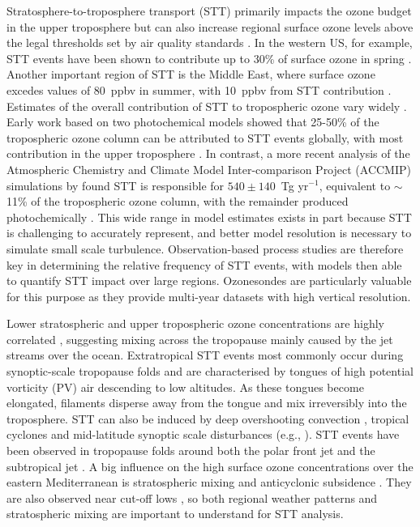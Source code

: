 Stratosphere-to-troposphere transport (STT) primarily impacts the ozone budget in the upper troposphere but can also increase regional surface ozone levels above the legal thresholds set by air quality standards \citep{Danielson1968, Lelieveld2009, Lefohn2011, Langford2012, Zhang2014}.
In the western US, for example, STT events have been shown to contribute up to 30\% of surface ozone in spring \citep{Lin2012}.
Another important region of STT is the Middle East, where surface ozone excedes values of 80~ppbv in summer, with 10~ppbv from STT contribution \citep{Lelieveld2009}.
Estimates of the overall contribution of STT to tropospheric ozone vary widely \citep[e.g.,][]{Galani2003, Stohl2003, Stevenson2006, Lefohn2011}.
Early work based on two photochemical models showed that 25-50\% of the tropospheric ozone column can be attributed to STT events globally, with most contribution in the upper troposphere \citep{Stohl2003}.
In contrast, a more recent analysis of the Atmospheric Chemistry and Climate Model Inter-comparison Project (ACCMIP) simulations by \citet{Young2013} found STT is responsible for $540\pm140$~Tg yr$^{-1}$, equivalent to $\sim$11\% of the tropospheric ozone column, with the remainder produced photochemically \citep{Monks2015}.
This wide range in model estimates exists in part because STT is challenging to accurately represent, and better model resolution is necessary to simulate small scale turbulence.
Observation-based process studies are therefore key in determining the relative frequency of STT events, with models then able to quantify STT impact over large regions.
Ozonesondes are particularly valuable for this purpose as they provide multi-year datasets with high vertical resolution.

Lower stratospheric and upper tropospheric ozone concentrations are highly correlated \citep{Terao2008}, suggesting mixing across the tropopause mainly caused by the jet streams over the ocean.
Extratropical STT events most commonly occur during synoptic-scale tropopause folds \citep{Sprenger2003, Tang2012, Frey2015} and are characterised by tongues of high potential vorticity (PV) air descending to low altitudes.
As these tongues become elongated, filaments disperse away from the tongue and mix irreversibly into the troposphere.
STT can also be induced by deep overshooting convection \citep{Frey2015}, tropical cyclones \citep{Das2016} and mid-latitude synoptic scale disturbances (e.g., \citet{Stohl2003, Mihalikova2012}). 
STT events have been observed in tropopause folds around both the polar front jet \citep{Vaughan1994, Beekmann1997} and the subtropical jet \citep{Baray2000}.
A big influence on the high surface ozone concentrations over the eastern Mediterranean is stratospheric mixing and anticyclonic subsidence \citep{Zanis2014}. 
They are also observed near cut-off lows \citep{Price1993, Wirth1995}, so both regional weather patterns and stratospheric mixing are important to understand for STT analysis.

